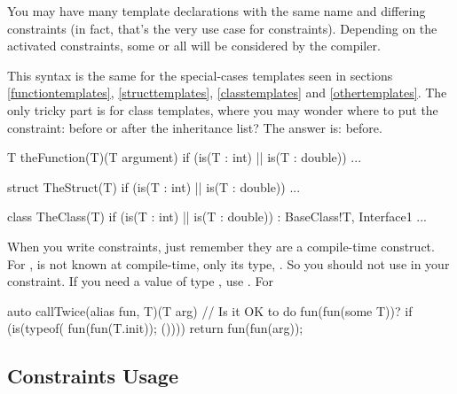 You may have many template declarations with the same name and differing constraints (in fact, that's the very use case for constraints). Depending on the activated constraints, some or all will be considered by the compiler.


This syntax is the same for the special-cases templates seen in sections \ref{functiontemplates}, \ref{structtemplates}, \ref{classtemplates} and \ref{othertemplates}. The only tricky part is for class templates, where you may wonder where to put the constraint: before or after the inheritance list? The answer is: before.

\begin{dcode}
T theFunction(T)(T argument)
    if (is(T : int) || is(T : double)) { ... }

struct TheStruct(T) 
    if (is(T : int) || is(T : double)) { ... }

class TheClass(T) 
    if (is(T : int) || is(T : double)) 
    : BaseClass!T, Interface1 { ... }
\end{dcode}

When you write constraints, just remember they are a compile-time construct. For ,  is not known at compile-time, only its type, . So you should not use  in your constraint. If you need a value of type , use . For 

\begin{dcode}
auto callTwice(alias fun, T)(T arg)
    // Is it OK to do fun(fun(some T))?
    if (is(typeof({ fun(fun(T.init)); }()))) 
{
    return fun(fun(arg));
}
\end{dcode}

\subsection{Constraints Usage}\label{constraintsusage}

